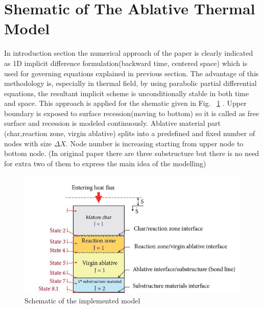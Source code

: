 \documentclass[a4paper, 12pt]{article} %
\begin{document}
\section{Shematic of The Ablative Thermal Model}
In introduction section the numerical approach of the paper is clearly indicated as 1D implicit difference formulation(backward time, centered space) which is used for governing equations explained in previous section. The advantage of this methodology is, especially in thermal field, by using parabolic partial differential equations, the resultant implicit scheme is unconditionally stable in both time and space. This approach is applied for the shematic given in Fig. ~\ref{fig:model} . Upper boundary is exposed to surface recession(moving to bottom) so it is called as free surface and recession is modeled continuously. Ablative material part (char,reaction zone, virgin ablative) splits into a predefined and fixed number of nodes with size $\Delta X$. Node number is increasing starting from upper node to bottom node. (In original paper there are three substructure but there is no need for extra two of them to express the main idea of the modelling) \newline
\begin{figure}[h!]
  \centering
  \includegraphics[width=0.8 \linewidth]{model.jpg}
  \caption{Schematic of the implemented model}
  \label{fig:model}
\end{figure}
\end{document}
